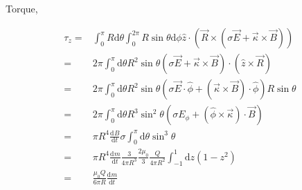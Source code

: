 \documentclass[10pt,fleqn]{article}
\newcommand{\ud}{\mathrm{d}}
\newcommand{\eqar}[1]
{
  \begin{align*}
    #1
  \end{align*}
}
\newcommand{\paren}[1]{{\left({#1}\right)}}
\newcommand{\diff}[3][{}]{{\frac{\ud^{#1} {#2}}{\ud {#3}{}^{#1}}}}
\begin{document}
\subsection{}
Torque,
\eqar{
  \tau_z=&\int_0^\pi R\ud\theta\int_0^{2\pi}R\sin\theta\ud\phi
  \hat z\cdot\paren{\vec R\times\paren{\sigma\vec E+\vec \kappa\times\vec B}}\\
  =&2\pi\int_0^\pi\ud\theta R^2\sin\theta
  \paren{\sigma\vec E+\vec \kappa\times\vec B}\cdot\paren{\hat z\times\vec R}\\
  =&2\pi\int_0^\pi\ud\theta R^2\sin\theta
  \paren{\sigma\vec E\cdot\hat\phi+\paren{\vec \kappa\times\vec B}\cdot\hat\phi} R\sin\theta\\
  =&2\pi\int_0^\pi\ud\theta R^3\sin^2\theta
  \paren{\sigma E_\phi+\paren{\hat\phi\times\vec \kappa}\cdot\vec B}\\
  =&\pi R^4\diff{B}{t}\sigma\int_0^\pi\ud\theta\sin^3\theta\\
  =&\pi R^4\diff{m}{t}\frac{3}{4\pi R^3}\frac{2\mu_0}{3}\frac{Q}{4\pi R^2}
  \int_{-1}^1\ud z\paren{1-z^2}\\
  =&\frac{\mu_0Q}{6\pi R}\diff{m}{t}
}
\subsection{}
\end{document}
